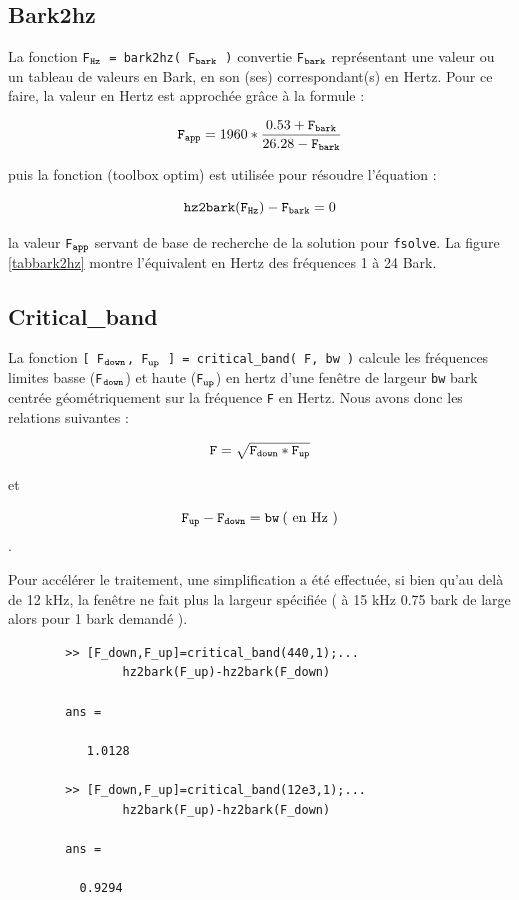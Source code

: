     \bigskip
    \subsection{Bark2hz}
    \label{bark2hz}
    La fonction {\tt F$_{\tt Hz}$ = bark2hz( F$_{\tt bark}$ )}
    convertie {\tt F$_{\tt bark}$} repr{\'e}sentant une valeur ou
    un tableau de valeurs en Bark, en son (ses) correspondant(s)
    en Hertz. Pour ce faire, la valeur en Hertz est approch{\'e}e gr{\^a}ce
    {\`a} la formule :

    $$ {\tt F_{app}} = 1960 * \frac{0.53 + {\tt F_{bark}}}{26.28 - {\tt F_{bark}}}
    $$

    \noindent puis la fonction  (toolbox optim)
    est utilis{\'e}e pour r{\'e}soudre l'{\'e}quation :

    $$ {\tt hz2bark}({\tt F_{Hz}}) - {\tt F_{bark}} = 0 $$

    \noindent la valeur {\tt F$_{\tt app}$} servant de base de
    recherche de la solution pour {\tt fsolve}. La figure
    \ref{tabbark2hz} montre l'{\'e}quivalent en Hertz des fr{\'e}quences
    1 {\`a} 24 Bark.\\


    \newpage
    \subsection{Critical\_band}
    \label{criticalband}
    La fonction {\tt [ F$_{\tt down}$, F$_{\tt up}$ ] = critical\_band( F, bw )}
    calcule les fr{\'e}quences limites basse ({\tt F$_{\tt down}$})
    et haute ({\tt F$_{\tt up}$}) en hertz d'une fen{\^e}tre de largeur
    {\tt bw} bark centr{\'e}e g{\'e}om{\'e}triquement sur la fr{\'e}quence {\tt F}
    en Hertz. Nous avons donc les relations suivantes :

    $$ {\tt F} = \sqrt{ {\tt F_{down}} * {\tt F_{up}} } $$
    \begin{center} et \end{center}
    $$ {\tt F_{up}} - {\tt F_{down}} = {\tt bw}\:(\mbox{ en Hz })$$.

    Pour acc{\'e}l{\'e}rer le traitement, une simplification a {\'e}t{\'e}
    effectu{\'e}e, si bien qu'au del{\`a} de 12 kHz, la fen{\^e}tre ne fait
    plus la largeur sp{\'e}cifi{\'e}e ( {\`a} 15 kHz 0.75 bark de large alors
    pour 1 bark demand{\'e} ).\\

    \begin{verbatim}
        >> [F_down,F_up]=critical_band(440,1);...
                hz2bark(F_up)-hz2bark(F_down)

        ans =

           1.0128

        >> [F_down,F_up]=critical_band(12e3,1);...
                hz2bark(F_up)-hz2bark(F_down)

        ans =

          0.9294
    \end{verbatim}


